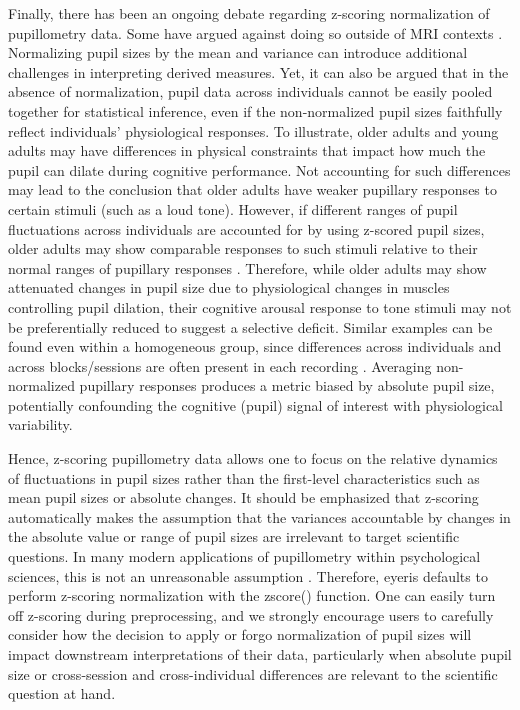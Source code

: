 Finally, there has been an ongoing debate regarding z-scoring normalization of pupillometry data. Some have argued against doing so outside of MRI contexts \parencite{steinhauer2022publication}. Normalizing pupil sizes by the mean and variance can introduce additional challenges in interpreting derived measures. Yet, it can also be argued that in the absence of normalization, pupil data across individuals cannot be easily pooled together for statistical inference, even if the non-normalized pupil sizes faithfully reflect individuals’ physiological responses. To illustrate, older adults and young adults may have differences in physical constraints that impact how much the pupil can dilate during cognitive performance. Not accounting for such differences may lead to the conclusion that older adults have weaker pupillary responses to certain stimuli (such as a loud tone). However, if different ranges of pupil fluctuations across individuals are accounted for by using z-scored pupil sizes, older adults may show comparable responses to such stimuli relative to their normal ranges of pupillary responses \parencite{he2020age}. Therefore, while older adults may show attenuated changes in pupil size due to physiological changes in muscles controlling pupil dilation, their cognitive arousal response to tone stimuli may not be preferentially reduced to suggest a selective deficit. Similar examples can be found even within a homogeneous group, since differences across individuals and across blocks/sessions are often present in each recording \parencite[e.g.,][]{madore2020memory}. Averaging non-normalized pupillary responses produces a metric biased by absolute pupil size, potentially confounding the cognitive (pupil) signal of interest with physiological variability.

Hence, z-scoring pupillometry data allows one to focus on the relative dynamics of fluctuations in pupil sizes rather than the first-level characteristics such as mean pupil sizes or absolute changes. It should be emphasized that z-scoring automatically makes the assumption that the variances accountable by changes in the absolute value or range of pupil sizes are irrelevant to target scientific questions. In many modern applications of pupillometry within psychological sciences, this is not an unreasonable assumption \parencite[i.e.,][]{bradshaw1969background,gilzenrat2010pupil,he2020age,peysakhovich2017impact,vangerven2004memory}. Therefore, eyeris defaults to perform z-scoring normalization with the zscore() function. One can easily turn off z-scoring during preprocessing, and we strongly encourage users to carefully consider how the decision to apply or forgo normalization of pupil sizes will impact downstream interpretations of their data, particularly when absolute pupil size or cross-session and cross-individual differences are relevant to the scientific question at hand.

